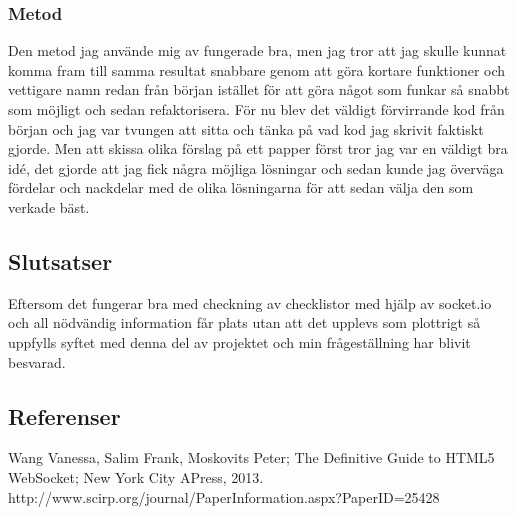 \subsubsection{Metod}
Den metod jag använde mig av fungerade bra, men jag tror att jag skulle kunnat komma fram till samma resultat snabbare genom att göra kortare funktioner och vettigare namn redan från början istället för att göra något som funkar så snabbt som möjligt och sedan refaktorisera. För nu blev det väldigt förvirrande kod från början och jag var tvungen att sitta och tänka på vad kod jag skrivit faktiskt gjorde. Men att skissa olika förslag på ett papper först tror jag var en väldigt bra idé, det gjorde att jag fick några möjliga lösningar och sedan kunde jag överväga fördelar och nackdelar med de olika lösningarna för att sedan välja den som verkade bäst.
\pagebreak

\subsection{Slutsatser}
Eftersom det fungerar bra med checkning av checklistor med hjälp av socket.io och all nödvändig information får plats utan att det upplevs som plottrigt så uppfylls syftet med denna del av projektet och min frågeställning har blivit besvarad.

\subsection{Referenser}
\vspace{-9mm}
\begin{thebibliography}{9}
 Wang Vanessa, Salim Frank, Moskovits Peter; The Definitive Guide to HTML5 WebSocket; New York City APress, 2013.
 http://www.scirp.org/journal/PaperInformation.aspx?PaperID=25428
\end{thebibliography}